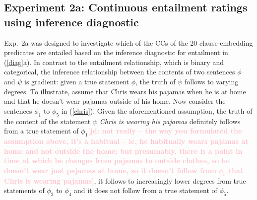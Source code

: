 \documentclass[11pt,fleqn]{article}
\newcommand{\jd}[1]{\textbf{\textcolor{Pink}{[jd: #1]}}}
\newcommand{\6}{\mbox{$[\hspace*{-.6mm}[$}}
\newcommand{\9}{\mbox{$]\hspace*{-.6mm}]$}}
\begin{document}
%
%
%
%

\subsection{Experiment 2a: Continuous entailment ratings using inference diagnostic}\label{s31}

Exp.~2a was designed to investigate which of the CCs of the 20 clause-embedding predicates are entailed based on the inference diagnostic for entailment in (\ref{diag}a). In contrast to the entailment relationship, which is binary and categorical, the inference relationship between the contents of two sentences $\phi$ and $\psi$ is gradient: given a true statement $\phi$, the truth of $\psi$ follows to varying degrees. To illustrate, assume that Chris wears his pajamas when he is at home and that he doesn't wear pajamas outside of his home. Now consider the sentences $\phi_1$ to $\phi_5$ in (\ref{chris}). Given the aforementioned assumption, the truth of the content of the statement $\psi$ {\em Chris is wearing his pajamas} definitely follows from a true statement of $\phi_1$\jd{not really -- the way you formulated the assumption above, it's a habitual -- ie, he habitually wears pajamas at home and not outside the home; but presumably, there is a point in time at which he changes from pajamas to outside clothes, so he doesn't wear just pajamas at home, so it doesn't follow from $\phi_5$ that Chris is wearing pajamas}, it follows to increasingly lower degrees from true statements of $\phi_2$ to $\phi_4$ and it does not follow from a true statement of $\phi_5$. 
\end{document}
